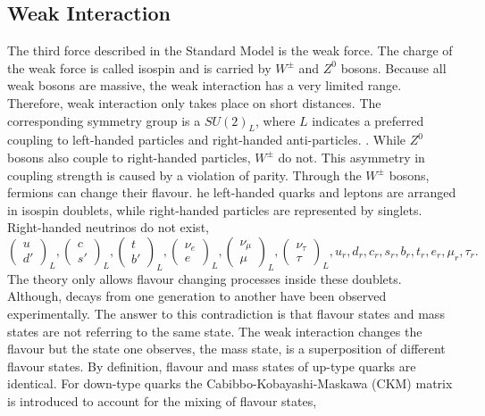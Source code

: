 	\subsection{Weak Interaction}
	The third force described in the Standard Model is the weak force. The charge of the weak force is called isospin and is carried by $W^\pm$ and $Z^0$ bosons. Because all weak bosons are massive, the weak interaction has a very limited range. Therefore, weak interaction only takes place on short distances. The corresponding symmetry group is a $SU(2)_L$, where $L$ indicates a preferred coupling to left-handed particles and right-handed anti-particles. . While $Z^0$ bosons also couple to right-handed particles, $W^\pm$ do not. This asymmetry in coupling strength is caused by a violation of parity. Through the $W^\pm$ bosons, fermions can change their flavour. he left-handed quarks and leptons are arranged in isospin doublets, while right-handed particles are represented by singlets. Right-handed neutrinos do not exist,
	\begin{equation}
	\begin{pmatrix}	u \\ d'	\end{pmatrix}_L,
	\begin{pmatrix}	c \\ s'	\end{pmatrix}_L,
	\begin{pmatrix}	t \\ b'	\end{pmatrix}_L,
	\begin{pmatrix}	\nu_e \\ e	\end{pmatrix}_L,
	\begin{pmatrix}	\nu_\mu \\ \mu	\end{pmatrix}_L,
	\begin{pmatrix}	\nu_\tau \\ \tau	\end{pmatrix}_L,
	u_r, d_r, c_r, s_r, b_r, t_r, e_r, \mu_r, \tau_r.
	\end{equation}
	The theory only allows flavour changing processes inside these doublets. Although, decays from one generation to another have been observed experimentally. The answer to this contradiction is that flavour states and mass states are not referring to the same state. The weak interaction changes the flavour but the state one observes, the mass state, is a superposition of different flavour states. By definition, flavour and mass states of up-type quarks are identical. For down-type quarks the Cabibbo-Kobayashi-Maskawa (CKM) matrix is introduced to account for the mixing of flavour states,
